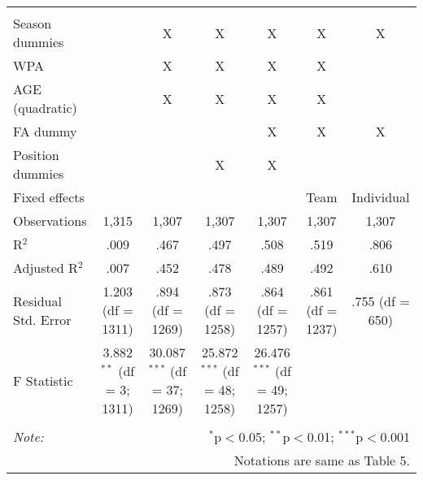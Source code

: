 \begin{table}[H]
\begin{tabular}{@{\extracolsep{5pt}}lcccccc}
  & & & & & & \\
\hline \\[-1.8ex]
Season dummies &  & X & X & X & X & X \\
WPA &  & X & X & X & X &  \\
AGE (quadratic) &  & X & X & X & X &  \\
FA dummy &  &  &  & X & X & X \\
Position dummies &  &  & X & X &  &  \\
Fixed effects &  &  &  &  & Team & Individual \\
Observations & 1,315 & 1,307 & 1,307 & 1,307 & 1,307 & 1,307 \\
R$^{2}$ & .009 & .467 & .497 & .508 & .519 & .806 \\
Adjusted R$^{2}$ & .007 & .452 & .478 & .489 & .492 & .610 \\
Residual Std. Error & 1.203 (df = 1311) & .894 (df = 1269) & .873 (df = 1258) & .864 (df = 1257) & .861 (df = 1237) & .755 (df = 650) \\
F Statistic & 3.882$^{**}$ (df = 3; 1311) & 30.087$^{***}$ (df = 37; 1269) & 25.872$^{***}$ (df = 48; 1258) & 26.476$^{***}$ (df = 49; 1257) &  &  \\
\hline
\hline \\[-1.8ex]
\textit{Note:}  & \multicolumn{6}{r}{$^{*}$p$<$0.05; $^{**}$p$<$0.01; $^{***}$p$<$0.001} \\
& \multicolumn{6}{r}{Notations are same as Table 5.} \\
\end{tabular}
\end{table}
